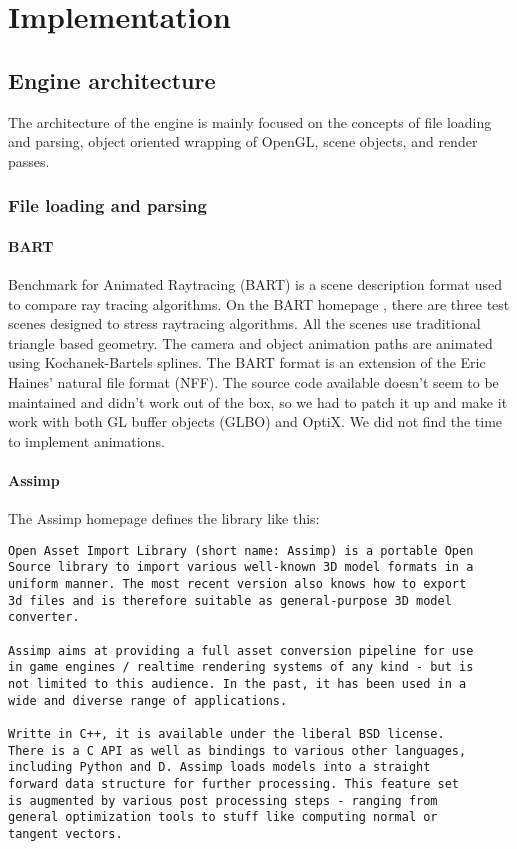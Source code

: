 \section{Implementation}

\subsection{Engine architecture}
The architecture of the engine is mainly focused on the concepts of file loading and parsing, object oriented wrapping of OpenGL, scene objects, and render passes.

\subsubsection{File loading and parsing}
\paragraph{BART}
Benchmark for Animated Raytracing (BART) is a scene description format used to compare ray tracing algorithms. On the BART homepage \cite{bart_homepage}, there are three test scenes designed to stress raytracing algorithms. All the scenes use traditional triangle based geometry. The camera and object animation paths are animated using  Kochanek-Bartels splines. The BART format is an extension of the Eric Haines' natural file format (NFF). The source code available doesn't seem to be maintained and didn't work out of the box, so we had to patch it up and make it work with both GL buffer objects (GLBO) and OptiX. We did not find the time to implement animations.

\paragraph{Assimp}
The Assimp homepage \cite{assimp_homepage} defines the library like this:
\begin{Verbatim}[frame=single,fontshape=it,framesep=1mm]
Open Asset Import Library (short name: Assimp) is a portable Open
Source library to import various well-known 3D model formats in a 
uniform manner. The most recent version also knows how to export 
3d files and is therefore suitable as general-purpose 3D model 
converter.

Assimp aims at providing a full asset conversion pipeline for use 
in game engines / realtime rendering systems of any kind - but is 
not limited to this audience. In the past, it has been used in a 
wide and diverse range of applications.

Writte in C++, it is available under the liberal BSD license. 
There is a C API as well as bindings to various other languages, 
including Python and D. Assimp loads models into a straight
forward data structure for further processing. This feature set 
is augmented by various post processing steps - ranging from 
general optimization tools to stuff like computing normal or 
tangent vectors.
\end{Verbatim}

